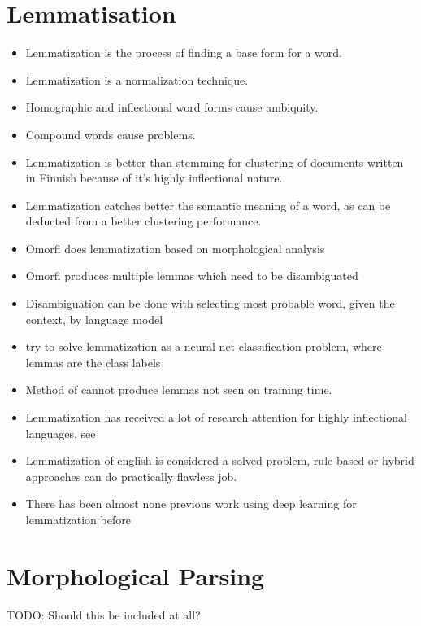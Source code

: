 \documentclass[12pt,a4paper,english
]{tutthesis}
\newcommand\todo[1]{{\color{red}TODO: #1}} %
\begin{document}
\section{Lemmatisation}
\label{se:lemmatisation}
\begin{itemize}
\item Lemmatization is the process of finding a base form for a word.
\item Lemmatization is a normalization technique. \cite{Korenius2004}
\item Homographic and inflectional word forms cause ambiquity. \cite{Korenius2004}
\item Compound words cause problems. \cite{Korenius2004}
\item Lemmatization is better than stemming for clustering of documents written in Finnish because of it's highly inflectional nature. \cite{Korenius2004}
\item Lemmatization catches better the semantic meaning of a word, as can be deducted from a better clustering performance.
\item Omorfi does lemmatization based on morphological analysis
\item Omorfi produces multiple lemmas which need to be disambiguated
\item Disambiguation can be done with selecting most probable word, given the context, by language model
\item \cite{Kestemont2016} try to solve lemmatization as a neural net classification problem, where lemmas are the class labels
\item Method of \cite{Kestemont2016} cannot produce lemmas not seen on training time.
\item Lemmatization has received a lot of research attention for highly inflectional languages, see \cite{Kestemont2016}
\item Lemmatization of english is considered a solved problem, rule based or hybrid approaches can do practically flawless job.
\item There has been almost none previous work using deep learning for lemmatization before \cite{Kestemont2016}
\end{itemize}

\section{Morphological Parsing}
\todo{Should this be included at all?}
\end{document}
